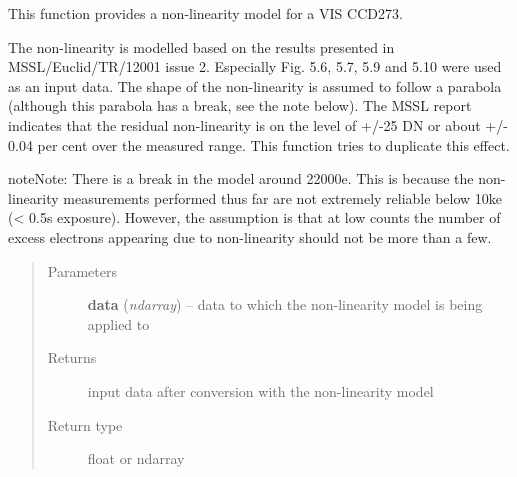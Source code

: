 \documentclass[a4paper,11pt,english]{sphinxmanual}
\begin{document}
\begin{fulllineitems}
\label{instrument:support.VISinstrumentModel.CCDnonLinearityModel}
This function provides a non-linearity model for a VIS CCD273.

The non-linearity is modelled based on the results presented in MSSL/Euclid/TR/12001 issue 2.
Especially Fig. 5.6, 5.7, 5.9 and 5.10 were used as an input data. The shape of the non-linearity is
assumed to follow a parabola (although this parabola has a break, see the note below). The MSSL report
indicates that the residual non-linearity is on the level of +/-25 DN or about +/- 0.04 per cent over
the measured range. This function tries to duplicate this effect.

\begin{notice}{note}{Note:}
There is a break in the model around 22000e. This is because the non-linearity measurements
performed thus far are not extremely reliable below 10ke (\textless{} 0.5s exposure). However, the
assumption is that at low counts the number of excess electrons appearing due to non-linearity should
not be more than a few.
\end{notice}
\begin{quote}\begin{description}
\item[{Parameters}] \leavevmode
\textbf{data} (\emph{ndarray}) -- data to which the non-linearity model is being applied to

\item[{Returns}] \leavevmode
input data after conversion with the non-linearity model

\item[{Return type}] \leavevmode
float or ndarray

\end{description}\end{quote}

\end{fulllineitems}

\end{document}
